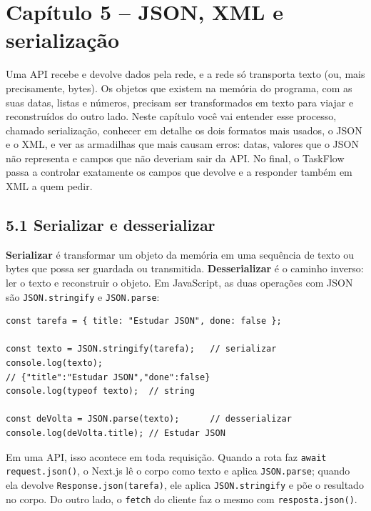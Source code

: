\section{Capítulo 5 -- JSON, XML e serialização}

Uma API recebe e devolve dados pela rede, e a rede só transporta texto (ou, mais precisamente, bytes). Os objetos que existem na memória do programa, com as suas datas, listas e números, precisam ser transformados em texto para viajar e reconstruídos do outro lado. Neste capítulo você vai entender esse processo, chamado serialização, conhecer em detalhe os dois formatos mais usados, o JSON e o XML, e ver as armadilhas que mais causam erros: datas, valores que o JSON não representa e campos que não deveriam sair da API. No final, o TaskFlow passa a controlar exatamente os campos que devolve e a responder também em XML a quem pedir.

\subsection{5.1 Serializar e desserializar}

\textbf{Serializar} é transformar um objeto da memória em uma sequência de texto ou bytes que possa ser guardada ou transmitida. \textbf{Desserializar} é o caminho inverso: ler o texto e reconstruir o objeto. Em JavaScript, as duas operações com JSON são \texttt{JSON.stringify} e \texttt{JSON.parse}:

\begin{codigo}
\begin{Verbatim}[breaklines=true, breaksymbolleft={}, fontsize=\footnotesize]
const tarefa = { title: "Estudar JSON", done: false };

const texto = JSON.stringify(tarefa);   // serializar
console.log(texto);
// {"title":"Estudar JSON","done":false}
console.log(typeof texto);  // string

const deVolta = JSON.parse(texto);      // desserializar
console.log(deVolta.title); // Estudar JSON
\end{Verbatim}
\end{codigo}

Em uma API, isso acontece em toda requisição. Quando a rota faz \texttt{await request.json()}, o Next.js lê o corpo como texto e aplica \texttt{JSON.parse}; quando ela devolve \texttt{Response.json(tarefa)}, ele aplica \texttt{JSON.stringify} e põe o resultado no corpo. Do outro lado, o \texttt{fetch} do cliente faz o mesmo com \texttt{resposta.json()}.

